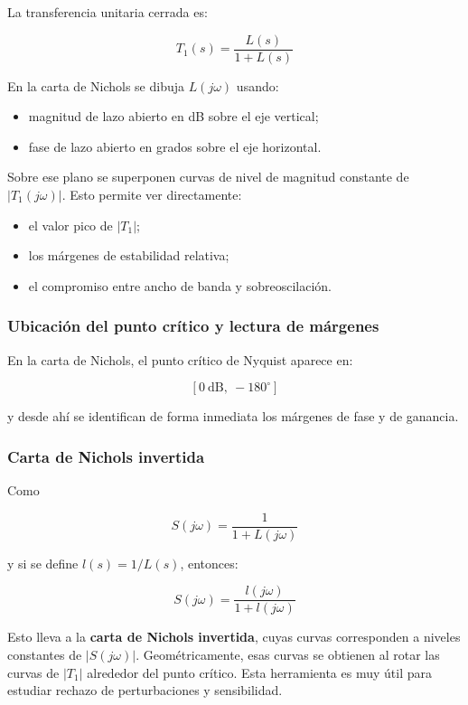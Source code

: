 La transferencia unitaria cerrada es:

\[
T_1(s)=\frac{L(s)}{1+L(s)} \tag{2.3.3}
\]

En la carta de Nichols se dibuja \(L(j\omega)\) usando:

\begin{itemize}
  \item magnitud de lazo abierto en dB sobre el eje vertical;
  \item fase de lazo abierto en grados sobre el eje horizontal.
\end{itemize}

Sobre ese plano se superponen curvas de nivel de magnitud constante de \(|T_1(j\omega)|\). Esto permite ver directamente:

\begin{itemize}
  \item el valor pico de \(|T_1|\);
  \item los márgenes de estabilidad relativa;
  \item el compromiso entre ancho de banda y sobreoscilación.
\end{itemize}


\subsubsection{Ubicación del punto crítico y lectura de márgenes}
En la carta de Nichols, el punto crítico de Nyquist aparece en:

$$
[0\ \text{dB},\ -180^\circ]
$$

y desde ahí se identifican de forma inmediata los márgenes de fase y de ganancia.

\subsubsection{Carta de Nichols invertida}
Como

$$
S(j\omega)=\frac{1}{1+L(j\omega)}
$$

y si se define \(l(s)=1/L(s)\), entonces:

\[
S(j\omega)=\frac{l(j\omega)}{1+l(j\omega)} \tag{2.3.4}
\]

Esto lleva a la \textbf{carta de Nichols invertida}, cuyas curvas corresponden a niveles constantes de \(|S(j\omega)|\). Geométricamente, esas curvas se obtienen al rotar las curvas de \(|T_1|\) alrededor del punto crítico. Esta herramienta es muy útil para estudiar rechazo de perturbaciones y sensibilidad.

